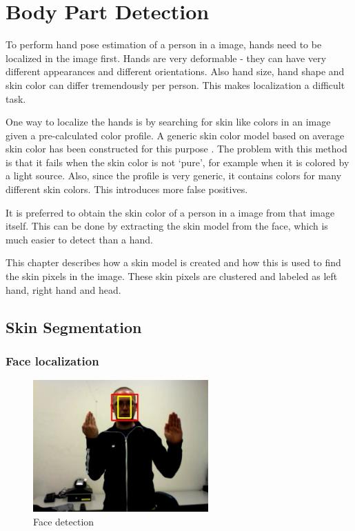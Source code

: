 
\chapter{Body Part Detection}
\label{ch:bodyparts}

To perform hand pose estimation of a person in a image, hands need to be localized in the image first. Hands are very deformable - they can have very different appearances and different orientations. Also hand size, hand shape and skin color can differ tremendously per person. This makes localization a  difficult task. 

One way to localize the hands is by searching for skin like colors in an image given a pre-calculated color profile. A generic skin color model based on average skin color has been constructed for this purpose \citep{Jones1999}. The problem with this method is that it fails when the skin color is not `pure', for example when it is colored by a light source. Also, since the profile is very generic, it contains colors for many different skin colors. This introduces more false positives.

It is preferred to obtain the skin color of a person in a image from that image itself. This can be done by extracting the skin model from the face, which is much easier to detect than a hand.

This chapter describes how a skin model is created and how this is used to find the skin pixels in the image. These  skin pixels are clustered and labeled as left hand, right hand and head. 

\section{Skin Segmentation}
\label{sec:skinmodel}

\subsection*{Face localization}

\begin{figure}
  \center{}
    \includegraphics[width=0.6\textwidth]{figures/pipeline/detected.jpg}
  \caption{Face detection}
  \label{fig:face_detection}
\end{figure}

